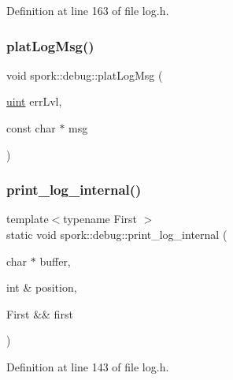 Definition at line 163 of file log.\+h.

\mbox{\label{namespacespork_1_1debug_ad263309a1fad3a21dcf0c66d025a3d91}} 
\subsubsection{\texorpdfstring{plat\+Log\+Msg()}{platLogMsg()}}
{\footnotesize\ttfamily void spork\+::debug\+::plat\+Log\+Msg (\begin{DoxyParamCaption}\item[{\hyperlink{defines_8h_a91ad9478d81a7aaf2593e8d9c3d06a14}{uint}}]{err\+Lvl,  }\item[{const char $\ast$}]{msg }\end{DoxyParamCaption})}

\mbox{\label{namespacespork_1_1debug_ac9c88ed5e936f4ebbe5c09cbdc3d3c9f}} 
\subsubsection{\texorpdfstring{print\+\_\+log\+\_\+internal()}{print\_log\_internal()}\hspace{0.1cm}{\footnotesize\ttfamily [1/2]}}
{\footnotesize\ttfamily template$<$typename First $>$ \\
static void spork\+::debug\+::print\+\_\+log\+\_\+internal (\begin{DoxyParamCaption}\item[{char $\ast$}]{buffer,  }\item[{int \&}]{position,  }\item[{First \&\&}]{first }\end{DoxyParamCaption})\hspace{0.3cm}{\ttfamily [static]}}



Definition at line 143 of file log.\+h.

\mbox{\label{namespacespork_1_1debug_abed0fd88d4a8b8ee6c705d43908d5fb5}} 
